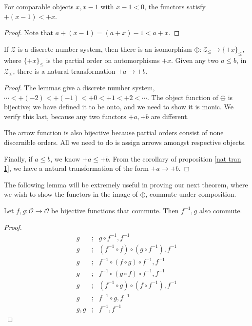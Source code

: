 \documentclass [12pt]{book}
\begin{document}
\begin{lemma order funct2}For comparable objects $x,x-1$ with $x-1<0$, the functors satisfy $+(x-1)<+x$.\end{lemma order funct2}

\begin{proof}Note that $a+(x-1)=(a+x)-1<a+x$.\end{proof}

\begin{theorem}If $\mathcal Z$ is a discrete number system, then there is an isomorphism $\oplus:\mathcal Z_\leq\rightarrow\{+x\}_\leq$, where $\{+x\}_\leq$ is the partial order on automorphisms $+x$. Given any two $a\leq b$, in $\mathcal Z_\leq$, there is a natural transformation $+a\rightarrow+b$.\end{theorem}

\begin{proof}The lemmas give a discrete number system, $\cdots<+(-2)<+(-1)<+0<+1<+2<\cdots$. The object function of $\oplus$ is bijective; we have defined it to be onto, and we need to show it is monic. We verify this last, because any two functors $+a,+b$ are different. 

The arrow function is also bijective because partial orders consist of none discernible orders. All we need to do is assign arrows amongst respective objects.

Finally, if $a\leq b$, we know $+a\leq+b$. From the corollary of proposition \ref{nat tran 1}, we have a natural transformation of the form $+a\rightarrow+b$.\end{proof}

The following lemma will be extremely useful in proving our next theorem, where we wish to show the functors in the image of $\oplus$, commute under composition.

\begin{lemma commute funct}Let $f,g:\mathcal O\rightarrow\mathcal O$ be bijective functions that commute. Then $f^{-1},g$ also commute.\end{lemma commute funct}

\begin{proof}\begin{eqnarray}\nonumber g&;&g\circ f^{-1},f^{-1}\\\nonumber g&;&(f^{-1}\circ f)\circ(g\circ f^{-1}),f^{-1}\\\nonumber g&;&f^{-1}\circ (f\circ g)\circ f^{-1},f^{-1}\\\nonumber g&;&f^{-1}\circ (g\circ f)\circ f^{-1},f^{-1}\\\nonumber g&;&(f^{-1}\circ g)\circ (f\circ f^{-1}),f^{-1}\\\nonumber g&;&f^{-1}\circ g,f^{-1}\\\nonumber g,g&;&f^{-1},f^{-1}\end{eqnarray}\end{proof}
\end{document}
